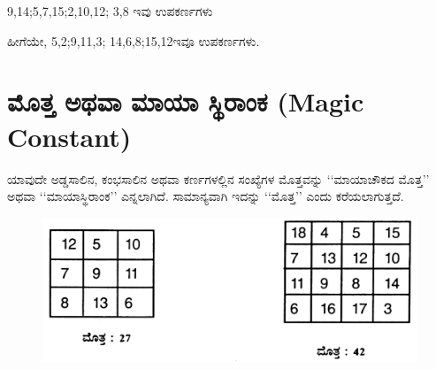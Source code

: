 9,14;5,7,15;2,10,12; 3,8 ಇವು ಉಪಕರ್ಣಗಳು

ಹೀಗೆಯೇ, 5,2;9,11,3; 14,6,8;15,12ಇವೂ ಉಪಕರ್ಣಗಳು.

\section*{ಮೊತ್ತ ಅಥವಾ ಮಾಯಾ ಸ್ಥಿರಾಂಕ (Magic Constant)}

ಯಾವುದೇ ಅಡ್ಡಸಾಲಿನ, ಕಂಭಸಾಲಿನ ಅಥವಾ ಕರ್ಣಗಳಲ್ಲಿನ ಸಂಖ್ಯೆಗಳ ಮೊತ್ತವನ್ನು ‘‘ಮಾಯಾಚೌಕದ ಮೊತ್ತ’’ ಅಥವಾ ‘‘ಮಾಯಾಸ್ಥಿರಾಂಕ’’ ಎನ್ನಲಾಗಿದೆ. ಸಾಮಾನ್ಯವಾಗಿ ಇದನ್ನು ‘‘ಮೊತ್ತ’’ ಎಂದು ಕರೆಯಲಾಗುತ್ತದೆ.
\begin{figure}[H]
\includegraphics{src/figures/chap2/fig2-5.jpg}
\end{figure}
